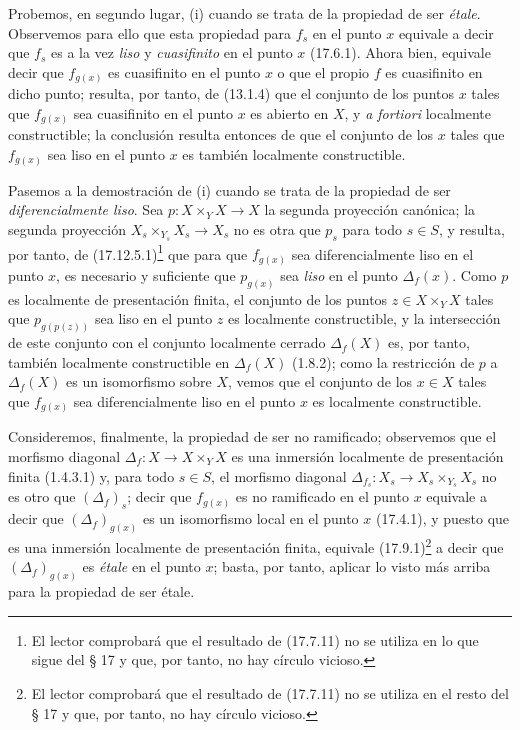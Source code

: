 Probemos, en segundo lugar, (i) cuando se trata de la propiedad de ser \emph{étale}. Observemos para ello que esta propiedad para $f_s$ en el punto $x$ equivale a decir que $f_s$ es a la vez \emph{liso} y \emph{cuasifinito} en el punto $x$ (17.6.1). Ahora bien, equivale decir que $f_{g(x)}$ es cuasifinito en el punto $x$ o que el propio $f$ es cuasifinito en dicho punto; resulta, por tanto, de (13.1.4) que el conjunto de los puntos $x$ tales que $f_{g(x)}$ sea cuasifinito en el punto $x$ es abierto en $X$, y \emph{a fortiori} localmente constructible; la conclusión resulta entonces de que el conjunto de los $x$ tales que $f_{g(x)}$ sea liso en el punto $x$ es también localmente constructible.

Pasemos a la demostración de (i) cuando se trata de la propiedad de ser \emph{diferencialmente liso}. Sea $p:X\times_Y X\to X$ la segunda proyección canónica; la segunda proyección $X_s\times_{Y_s}X_s\to X_s$ no es otra que $p_s$ para todo $s\in S$, y resulta, por tanto, de (17.12.5.1)\footnote{El lector comprobará que el resultado de (17.7.11) no se utiliza en lo que sigue del § 17 y que, por tanto, no hay círculo vicioso.} que para que $f_{g(x)}$ sea diferencialmente liso en el punto $x$, es necesario y suficiente que $p_{g(x)}$ sea \emph{liso} en el punto $\Delta_f(x)$. Como $p$ es localmente de presentación finita, el conjunto de los puntos $z\in X\times_Y X$ tales que $p_{g(p(z))}$ sea liso en el punto $z$ es localmente constructible, y la intersección de este conjunto con el conjunto localmente cerrado $\Delta_f(X)$ es, por tanto, también localmente constructible en $\Delta_f(X)$ (1.8.2); como la restricción de $p$ a $\Delta_f(X)$ es un isomorfismo sobre $X$, vemos que el conjunto de los $x\in X$ tales que $f_{g(x)}$ sea diferencialmente liso en el punto $x$ es localmente constructible.

Consideremos, finalmente, la propiedad de ser no ramificado; observemos que el morfismo diagonal $\Delta_f:X\to X\times_Y X$ es una inmersión localmente de presentación finita (1.4.3.1) y, para todo $s\in S$, el morfismo diagonal $\Delta_{f_s}:X_s\to X_s\times_{Y_s}X_s$ no es otro que $(\Delta_f)_s$; decir que $f_{g(x)}$ es no ramificado en el punto $x$ equivale a decir que $(\Delta_f)_{g(x)}$ es un isomorfismo local en el punto $x$ (17.4.1), y puesto que es una inmersión localmente de presentación finita, equivale (17.9.1)\footnote{El lector comprobará que el resultado de (17.7.11) no se utiliza en el resto del § 17 y que, por tanto, no hay círculo vicioso.} a decir que $(\Delta_f)_{g(x)}$ es \emph{étale} en el punto $x$; basta, por tanto, aplicar lo visto más arriba para la propiedad de ser étale.

